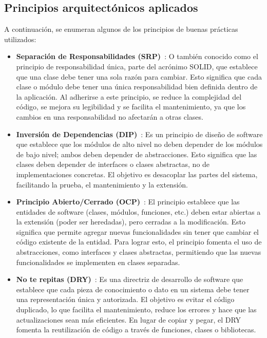 \subsection{Principios arquitectónicos aplicados}
A continuación, se enumeran algunos de los principios de buenas prácticas utilizados:

\begin{itemize}
    \item \textbf{Separación de Responsabilidades (SRP)}~\cite{principio-srp}: O también conocido como el principio de responsabilidad única, parte del acrónimo SOLID, que establece que una clase debe tener una sola razón para cambiar. Esto significa que cada clase o módulo debe tener una única responsabilidad bien definida dentro de la aplicación. Al adherirse a este principio, se reduce la complejidad del código, se mejora su legibilidad y se facilita el mantenimiento, ya que los cambios en una responsabilidad no afectarán a otras clases.
    \item \textbf{Inversión de Dependencias (DIP)}~\cite{patron-repository}: Es un principio de diseño de software que establece que los módulos de alto nivel no deben depender de los módulos de bajo nivel; ambos deben depender de abstracciones. Esto significa que las clases deben depender de interfaces o clases abstractas, no de implementaciones concretas. El objetivo es desacoplar las partes del sistema, facilitando la prueba, el mantenimiento y la extensión.
    \item \textbf{Principio Abierto/Cerrado (OCP)}~\cite{principio-ocp}: El principio establece que las entidades de software (clases, módulos, funciones, etc.) deben estar abiertas a la extensión (poder ser heredadas), pero cerradas a la modificación. Esto significa que permite agregar nuevas funcionalidades sin tener que cambiar el código existente de la entidad. Para lograr esto, el principio fomenta el uso de abstracciones, como interfaces y clases abstractas, permitiendo que las nuevas funcionalidades se implementen en clases separadas.
    \item \textbf{No te repitas (DRY)}~\cite{principio-dry}: Es una directriz de desarrollo de software que establece que cada pieza de conocimiento o dato en un sistema debe tener una representación única y autorizada. El objetivo es evitar el código duplicado, lo que facilita el mantenimiento, reduce los errores y hace que las actualizaciones sean más eficientes. En lugar de copiar y pegar, el DRY fomenta la reutilización de código a través de funciones, clases o bibliotecas.
\end{itemize}

